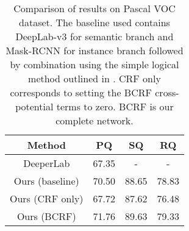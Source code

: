\begin{table}[]\centering
	\begin{tabular}{|c|c|c|c|}
		\hline
		\textbf{Method} & \textbf{PQ} & \textbf{SQ} & \textbf{RQ} \\ \hline
		DeeperLab \cite{deeperLab}      & 67.35       & -           & -           \\ \hline
		Ours (baseline) & 70.50       & 88.65       & 78.83       \\ \hline
		Ours (CRF only) & 67.72       & 87.62       & 76.48       \\ \hline
		Ours (BCRF)     & 71.76       & 89.63       & 79.33       \\ \hline
	\end{tabular}
	\vspace{-0.2cm}
	\caption{Comparison of results on Pascal VOC dataset. The baseline used contains DeepLab-v3 for semantic branch and Mask-RCNN for instance branch followed by combination using the simple logical method outlined in \cite{panoptickirillov2017}. CRF only corresponds to setting the BCRF cross-potential terms to zero. BCRF is our complete network.}
	\label{tbl:pascal_e2e}
	\vspace{0.5cm}
\end{table}